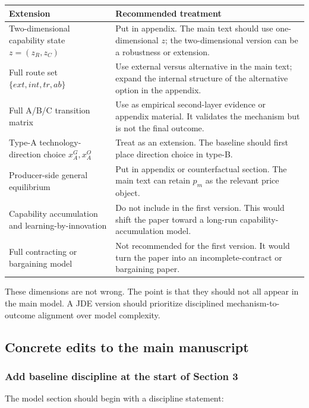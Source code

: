 \documentclass[12pt]{article}
\begin{document}
\begin{longtable}{p{}p{}}
\toprule
Extension & Recommended treatment \\
\midrule
Two-dimensional capability state $z=(z_R,z_C)$ & Put in appendix. The main text should use one-dimensional $z$; the two-dimensional version can be a robustness or extension. \\
\addlinespace
Full route set $\{ext,int,tr,ab\}$ & Use external versus alternative in the main text; expand the internal structure of the alternative option in the appendix. \\
\addlinespace
Full A/B/C transition matrix & Use as empirical second-layer evidence or appendix material. It validates the mechanism but is not the final outcome. \\
\addlinespace
Type-A technology-direction choice $x_A^G,x_A^O$ & Treat as an extension. The baseline should first place direction choice in type-B. \\
\addlinespace
Producer-side general equilibrium & Put in appendix or counterfactual section. The main text can retain $p_m$ as the relevant price object. \\
\addlinespace
Capability accumulation and learning-by-innovation & Do not include in the first version. This would shift the paper toward a long-run capability-accumulation model. \\
\addlinespace
Full contracting or bargaining model & Not recommended for the first version. It would turn the paper into an incomplete-contract or bargaining paper. \\
\bottomrule
\end{longtable}

These dimensions are not wrong. The point is that they should not all appear in the main model. A JDE version should prioritize disciplined mechanism-to-outcome alignment over model complexity.

\subsection{Concrete edits to the main manuscript}

\subsubsection{Add baseline discipline at the start of Section 3}

The model section should begin with a discipline statement:
\end{document}
